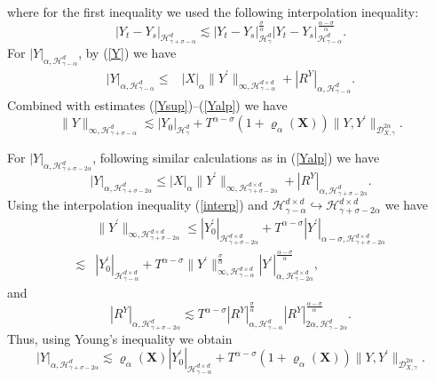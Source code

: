 \documentclass[10pt,a4paper]{article}
\numberwithin{equation}{section}
\begin{document}
where for the first inequality we used the following interpolation inequality: $$|Y_t-Y_s|_{\mathcal H_{\gamma+\sigma-\alpha}^{d} } \lesssim |Y_t-Y_s|_{\mathcal H_{\gamma}^{d}}^{\frac \sigma \alpha} |Y_t-Y_s|_{\mathcal H_{\gamma-\alpha}^{d}}^{\frac {\alpha-\sigma} \alpha}.$$
For $|Y|_{\alpha, \mathcal H_{\gamma-\alpha}^{d} }$, by (\ref{Y}) we have
\begin{align}\label{Yalp}
	|Y|_{\alpha, \mathcal H_{\gamma-\alpha}^{d}}
	\leq & |X|_\alpha \|Y^\prime\|_{\infty, \mathcal H_{\gamma-\alpha}^{d \times d} }	
	+|R^{Y} |_{\alpha, \mathcal H_{\gamma-\alpha}^{d} }.
\end{align}
Combined with estimates (\ref{Ysup})--(\ref{Yalp}) we have
\begin{equation}\label{Gsup1}
	\|Y\|_{\infty,\mathcal H_{\gamma+\sigma-\alpha}^{d}}
	\lesssim |Y_0|_{\mathcal H_\gamma^d}+T^{\alpha-\sigma} (1+\varrho_{\alpha}(\mathbf{X})) \|Y,Y^\prime\|_{\mathcal{D}_{X,\gamma}^{2\alpha}}.
\end{equation}





For $|Y|_{\alpha,\mathcal H_{\gamma+\sigma-2\alpha}^{d} }$,
following similar calculations as in (\ref{Yalp}) we have
\begin{equation*}
	|Y|_{\alpha,\mathcal H_{\gamma+\sigma-2\alpha}^{d}}
	\leq |X|_\alpha \|Y^\prime\|_{\infty, \mathcal H_{\gamma+\sigma-2\alpha}^{d \times d} }+|R^{Y}|_{\alpha, \mathcal H_{\gamma+\sigma-2\alpha}^{d}}.
\end{equation*}
Using the interpolation inequality (\ref{interp}) and $\mathcal H_{\gamma-\alpha}^{d \times d} \hookrightarrow \mathcal H_{\gamma+\sigma-2\alpha}^{d \times d}$ we have
\begin{align}\label{DGGsup}
	&\|Y^\prime\|_{\infty, \mathcal H_{\gamma+\sigma-2\alpha}^{d \times d}}
	\leq  |Y_0^\prime|_{\mathcal H_{\gamma+\sigma-2\alpha}^{d \times d}} + T^{\alpha-\sigma}  |Y^\prime |_{\alpha-\sigma,\mathcal H_{\gamma+\sigma-2\alpha}^{d \times d}}\nonumber\\
	\lesssim & |Y_0^\prime|_{\mathcal H_{\gamma-\alpha}^{d \times d}}+T^{\alpha-\sigma} \|Y^\prime\|_{\infty,\mathcal H_{\gamma-\alpha}^{d \times d} }^{\frac \sigma \alpha} |Y^\prime |_{\alpha,\mathcal H_{\gamma-2\alpha}^{d \times d} }^{\frac {\alpha-\sigma} \alpha},
\end{align}
and
\begin{equation*}
	|R^{Y}|_{\alpha, \mathcal H_{\gamma+\sigma-2\alpha}^{d}}
	\lesssim T^{\alpha-\sigma} |R^{Y}|_{\alpha, \mathcal H_{\gamma-\alpha}^{d} }^{\frac \sigma \alpha}
	|R^{Y}|_{2\alpha, \mathcal H_{\gamma-2\alpha}^{d} }^{\frac {\alpha-\sigma} \alpha}.
\end{equation*}
Thus, using Young's inequality we obtain
\begin{equation}\label{G1alp}
	|Y|_{\alpha,\mathcal H_{\gamma+\sigma-2\alpha}^{d}}
	\lesssim \varrho_{\alpha}(\mathbf{X})|Y_0^\prime|_{\mathcal H_{\gamma-\alpha}^{d \times d}}+T^{\alpha-\sigma}  (1+\varrho_{\alpha}(\mathbf{X})) \|Y,Y^\prime\|_{\mathcal{D}_{X,\gamma}^{2\alpha}}.
\end{equation}
\end{document}

